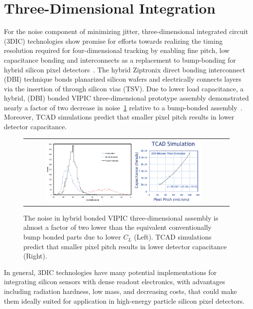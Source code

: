 \section{Three-Dimensional Integration}
For the noise component of minimizing jitter, three-dimensional integrated circuit (3DIC) technologies show promise for efforts towards realizing the timing resolution required for four-dimensional tracking by enabling fine pitch, low capacitance bonding and interconnects as a replacement to bump-bonding for hybrid silicon pixel detectors~\cite{7167712,7027258}. 
The hybrid Ziptronix direct bonding interconnect (DBI) technique bonds planarized silicon wafers and electrically connects layers via the insertion of through silicon vias (TSV). 
Due to lower load capacitance, a hybrid, (DBI) bonded VIPIC three-dimensional prototype assembly demonstrated nearly a factor of two decrease in noise~\ref{FusionBondedNoise_PixelPitchCapacitance} relative to a bump-bonded assembly~\cite{Lipton:2018mqk}.  
Moreover, TCAD simulations predict that smaller pixel pitch results in lower detector capacitance.
\begin{figure}[!htb]
  \begin{center}
    \begin{tabular}{cc}
        \includegraphics[width=0.45\textwidth]{fig_FastTiming/FusionBondedNoise.png}
        \includegraphics[width=0.35\textwidth]{fig_FastTiming/PixelPitch_Capacitance.png}
    \end{tabular}
    \caption{The noise in hybrid bonded VIPIC three-dimensional assembly is almost a factor of two lower than the equivalent conventionally bump bonded parts due to lower $C_L$ (Left).
            TCAD simulations predict that smaller pixel pitch results in lower detector capacitance (Right).
            }            
    \label{FusionBondedNoise_PixelPitchCapacitance}
  \end{center}
\end{figure}
In general, 3DIC technologies have many potential implementations for integrating silicon sensors with dense readout electronics, with advantages including radiation hardness, low mass, and decreasing costs, that could make them ideally suited for application in high-energy particle silicon pixel detectors.

